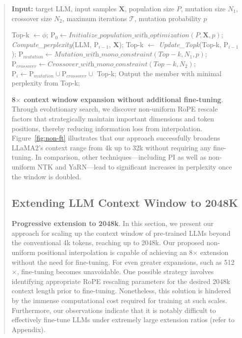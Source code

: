 \begin{abstract}
\begin{algorithm}[t]
	\small
	\caption{The search algorithm}
	\textbf{Input:} target LLM, input samples $\mathbf{X}$, population size $P$, mutation size $N_1$, crossover size $N_2$, maximum iterations $\mathcal{T}$, mutation probability $p$ \\

	\begin{algorithmic}[1]
		\label{alg:search}
		\STATE Top-k $\gets \phi$;	
		\STATE $\text{P}_0 \gets \textit{Initialize\_population\_with\_optimization}(P, \mathbf{X}, p)$;
		\STATE \textit{Compute\_perplexity}(LLM, $\text{P}_{i-1}$, $\mathbf{X}$);
		\STATE Top-k $\gets$ \textit{Update\_Topk}(Top-k, $\text{P}_{i-1}$);
		\STATE $\text{P}_{mutation} \gets \textit{Mutation\_with\_mono\_constraint}(Top-k, N_1, p)$;
		\STATE $\text{P}_{crossover} \gets \textit{Crossover\_with\_mono\_constraint}(Top-k, N_2)$;
		\STATE $\text{P}_i \gets \text{P}_{mutation} \cup \text{P}_{crossover} \cup$ Top-k;
		\ENDFOR
		\STATE Output the member with minimal perplexity from Top-k;
	\end{algorithmic}
\end{algorithm}

\textbf{8$\times$ context window expansion without additional fine-tuning}. Through evolutionary search, we discover non-uniform RoPE rescale factors that strategically maintain important dimensions and token positions, thereby reducing information loss from interpolation. Figure~\ref{fig:non-ft} illustrates that our approach successfully broadens LLaMA2's context range from 4k up to 32k without requiring any fine-tuning. In comparison, other techniques—including PI as well as non-uniform NTK and YaRN—lead to significant increases in perplexity once the window is doubled.

\subsection{Extending LLM Context Window to 2048K}
\label{sec:extendto2048k}

\textbf{Progressive extension to 2048k}. In this section, we present our approach for scaling up the context window of pre-trained LLMs beyond the conventional 4k tokens, reaching up to 2048k. Our proposed non-uniform positional interpolation is capable of achieving an 8$\times$ extension without the need for fine-tuning. For even greater expansions, such as 512$\times$, fine-tuning becomes unavoidable. One possible strategy involves identifying appropriate RoPE rescaling parameters for the desired 2048k context length prior to fine-tuning. Nonetheless, this solution is hindered by the immense computational cost required for training at such scales. Furthermore, our observations indicate that it is notably difficult to effectively fine-tune LLMs under extremely large extension ratios (refer to Appendix).


\end{abstract}
